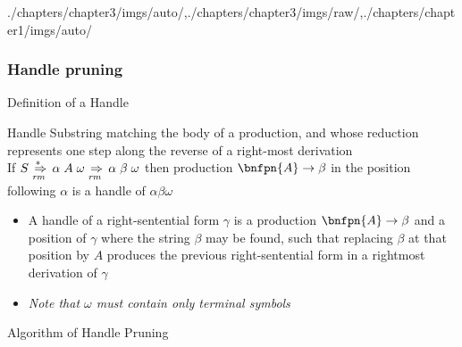 \begin{graphicspathcontext}{{./chapters/chapter3/imgs/auto/},{./chapters/chapter3/imgs/raw/},{./chapters/chapter1/imgs/auto/}}
\begin{bibunit}[apalike]
\subsubsection{Handle pruning}
\subsubsectiontableofcontentslide

\begin{frame}[t]{Definition of a Handle}
	\begin{definitionblock}{Handle}
		Substring matching the body of a production, and whose reduction represents one step along the reverse of a right-most derivation \\[.25cm]
		If $S \overset{*\hspace{.4em}}{\underset{\mathit{rm}\hspace{.3em}}{\Rightarrow}} \alpha\;A\;\omega \underset{\mathit{rm}\hspace{.3em}}{\Rightarrow} \alpha\;\beta\;\omega$ then production $\bnfpn{A} \bnfopo \beta$ in the position following $\alpha$ is a handle of $\alpha\beta\omega$
	\end{definitionblock}
		\begin{center}
		\end{center}
	\smaller
	\begin{itemize}
	\item A handle of a right-sentential form $\gamma$ is a production $\bnfpn{A} \bnfopo \beta$ and a position of $\gamma$ where the string $\beta$ may be found, such that replacing $\beta$ at that position by $A$ produces the previous right-sentential form in a rightmost derivation of $\gamma$
	\item \emph{Note that $\omega$ must contain only terminal symbols}
	\end{itemize}
\end{frame}

\begin{frame}[t]{Algorithm of Handle Pruning}
	\begin{scriptsize}
	\begin{myalgorithm}
	\end{myalgorithm}
	\end{scriptsize}
\end{frame}


\end{bibunit}
\end{graphicspathcontext}
